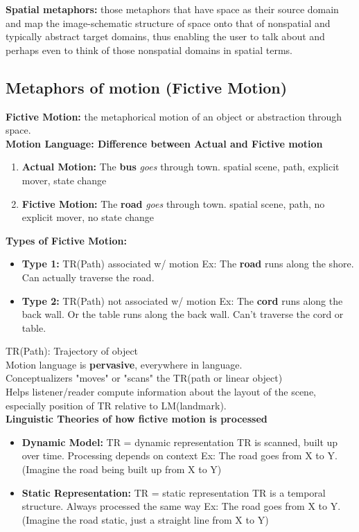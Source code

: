 \documentclass{article}
\begin{document}
\textbf{Spatial metaphors:} those metaphors that have space as their source domain and map the image-schematic structure of space onto that of nonspatial and typically abstract target domains, thus enabling the user to talk about and perhaps even to think of those nonspatial domains in spatial terms. \\

\subsection{Metaphors of motion (Fictive Motion)}
\textbf{Fictive Motion:} the metaphorical motion of an object or abstraction through space. \\

\noindent \textbf{Motion Language: Difference between Actual and Fictive motion}

\begin{enumerate}
    \item \textbf{Actual Motion:} The \textbf{bus} \textit{goes} through town.
        \subitem spatial scene, path, explicit mover, state change
    \item \textbf{Fictive Motion:} The \textbf{road} \textit{goes} through town. 
        \subitem spatial scene, path, no explicit mover, no state change
\end{enumerate}

\noindent \textbf{Types of Fictive Motion:} 
\begin{itemize}
    \item \textbf{Type 1:} TR(Path) associated w/ motion 
        \subitem Ex: The \textbf{road} runs along the shore. Can actually traverse the road.
    \item \textbf{Type 2:} TR(Path) not associated w/ motion 
        \subitem Ex: The \textbf{cord} runs along the back wall. Or the table runs along the back wall. Can't traverse the cord or table.  
\end{itemize}
TR(Path): Trajectory of object \\

\noindent Motion language is \textbf{pervasive},  everywhere in language. \\
Conceptualizers "moves" or "scans" the TR(path or linear object) \\
Helps listener/reader compute information about the layout of the scene, especially position of TR relative to LM(landmark). \\

\noindent \textbf{Linguistic Theories of how fictive motion is processed}
\begin{itemize}
    \item \textbf{Dynamic Model:} TR = dynamic representation
        \subitem TR is scanned, built up over time. 
        \subitem Processing depends on context
        \subitem Ex: The road goes from X to Y. (Imagine the road being built up from X to Y)
    \item \textbf{Static Representation:} TR = static representation
        \subitem TR is a temporal structure. 
        \subitem Always processed the same way
        \subitem Ex: The road goes from X to Y. (Imagine the road static, just a straight line from X to Y)
\end{itemize}
\end{document}
